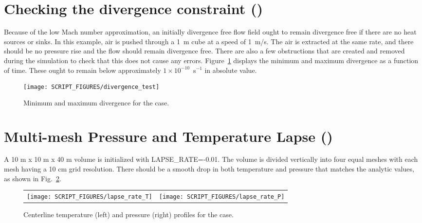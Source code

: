 \documentclass[11pt]{book}
\begin{document}
\section{Checking the divergence constraint (\texorpdfstring{}{divergence\_test})}
\label{divergence_test}

Because of the low Mach number approximation, an initially divergence free flow field ought to remain divergence free if there are no heat sources or sinks. In this example, air is pushed through a 1~m cube at a speed of 1~m/s. The air is extracted at the same rate, and there should be no pressure rise and the flow should remain divergence free. There are also a few obstructions that are created and removed during the simulation to check that this does not cause any errors. Figure~\ref{divergence_test_fig} displays the minimum and maximum divergence as a function of time. These ought to remain below approximately $1 \times 10^{-10}$~s$^{-1}$ in absolute value.

\begin{figure}[!ht]
\centering
\texttt{[image: SCRIPT\_FIGURES/divergence\_test]}
\caption[The  case]{Minimum and maximum divergence for the  case.}
\label{divergence_test_fig}
\end{figure}

\section{Multi-mesh Pressure and Temperature Lapse (\texorpdfstring{}{lapse\_rate})}
\label{lapse_rate}

A 10 m x 10 m x 40 m volume is initialized with {\ct LAPSE\_RATE=-0.01}.  The volume is divided vertically into four equal meshes with each mesh having a 10 cm grid resolution.  There should be a smooth drop in both temperature and pressure that matches the analytic values, as shown in Fig.~\ref{lapse_rate_fig}.

\begin{figure}[!ht]
\begin{tabular*}{\textwidth}{lr}
\texttt{[image: SCRIPT\_FIGURES/lapse\_rate\_T]} &
\texttt{[image: SCRIPT\_FIGURES/lapse\_rate\_P]}
\end{tabular*}
\caption[The  test case]{Centerline temperature (left) and pressure (right) profiles for the  case.}
\label{lapse_rate_fig}
\end{figure}
\end{document}
